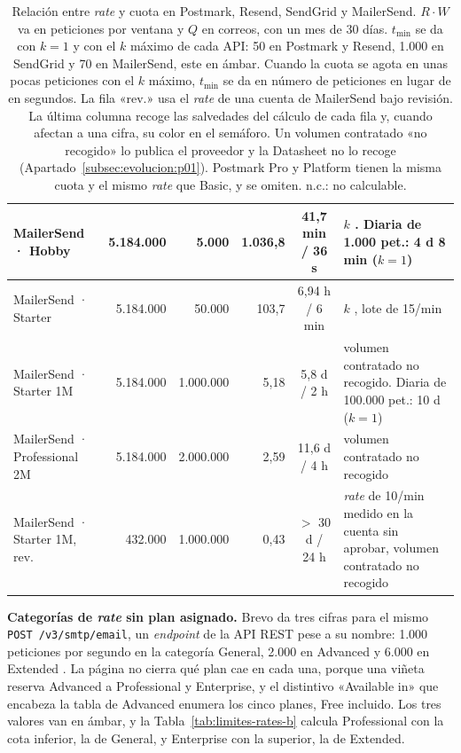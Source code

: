 \begin{table}[H]
\begin{tabular}{|l|r|r|r|c|p{3.2cm}|}
\hline
MailerSend · Hobby & 5.184.000 & 5.000 & 1.036,8 & 41,7 min / 36 s & $k$ \semambar{}. Diaria de 1.000 pet.: 4 d 8 min ($k{=}1$) \\
\hline
MailerSend · Starter & 5.184.000 & 50.000 & 103,7 & 6,94 h / 6 min & $k$ \semambar{}, lote de 15/min \semverde{} \\
\hline
MailerSend · Starter 1M & 5.184.000 & 1.000.000 & 5,18 & 5,8 d / 2 h & volumen contratado no recogido. Diaria de 100.000 pet.: 10 d ($k{=}1$) \\
\hline
MailerSend · Professional 2M & 5.184.000 & 2.000.000 & 2,59 & 11,6 d / 4 h & volumen contratado no recogido \\
\hline
MailerSend · Starter 1M, rev. & 432.000 & 1.000.000 & 0,43 & $>$ 30 d / 24 h & \textit{rate} de 10/min medido en la cuenta sin aprobar, volumen contratado no recogido \\
\hline
\end{tabular}
\caption[Relación entre \textit{rate} y cuota en Postmark, Resend, SendGrid y MailerSend]{Relación entre \textit{rate} y cuota en Postmark, Resend, SendGrid y MailerSend. $R \cdot W$ va en peticiones por ventana y $Q$ en correos, con un mes de 30 días. $t_{\min}$ se da con $k = 1$ y con el $k$ máximo de cada API: 50 en Postmark y Resend, 1.000 en SendGrid y 70 en MailerSend, este en ámbar. Cuando la cuota se agota en unas pocas peticiones con el $k$ máximo, $t_{\min}$ se da en número de peticiones en lugar de en segundos. La fila «rev.» usa el \textit{rate} de una cuenta de MailerSend bajo revisión. La última columna recoge las salvedades del cálculo de cada fila y, cuando afectan a una cifra, su color en el semáforo. Un volumen contratado «no recogido» lo publica el proveedor y la Datasheet no lo recoge (Apartado~\ref{subsec:evolucion:p01}). Postmark Pro y Platform tienen la misma cuota y el mismo \textit{rate} que Basic, y se omiten. n.c.: no calculable.}
\label{tab:limites-rates}
\end{table}

\textbf{Categorías de \textit{rate} sin plan asignado.}
Brevo da tres cifras para el mismo \texttt{POST /v3/smtp/email}, un \textit{endpoint} de la API REST pese a su nombre: 1.000 peticiones por segundo en la categoría General, 2.000 en Advanced y 6.000 en Extended \citep{brevodocs}.
La página no cierra qué plan cae en cada una, porque una viñeta reserva Advanced a Professional y Enterprise, y el distintivo «Available in» que encabeza la tabla de Advanced enumera los cinco planes, Free incluido.
Los tres valores van en ámbar, y la Tabla~\ref{tab:limites-rates-b} calcula Professional con la cota inferior, la de General, y Enterprise con la superior, la de Extended.

